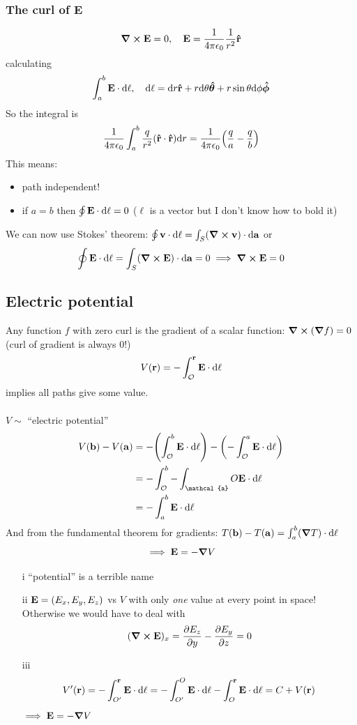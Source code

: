 \documentclass[../main.tex]{subfiles}
\begin{document}
\subsubsection{The curl of E}
\[\curl \vb E = 0, \quad \vb E = \frac{1}{4\pi \epsilon_0} \frac{1}{r^2} \vu r \]
calculating
\[\int_a^b \vb E \cdot \dd \ell, \quad \dd \ell = \dd r \vu r + r \dd \theta \vu*\theta + r\sin\theta \dd\phi \vu*\phi\]
So the integral is
\begin{align*}
    \ke \int_a^b \frac{q}{r^2}(\vu r \cdot \vu r) \dd r = \ke \qt(\frac{q}{a} - \frac{q}{b})
\end{align*}
This means:
\begin{itemize}
    \item path independent!
    \item if $a = b$ then $\oint \vb E \cdot \dd \vb\ell = 0$ ($\ell$ is a vector but I don't know how to bold it)
\end{itemize}
We can now use Stokes' theorem: \(\oint \vb v \cdot \dd \ell = \int_S (\curl \vb v) \cdot \dd \vb a\) or
\begin{align*}
    \oint \vb E \cdot \dd\ell = \int_S (\curl \vb E) \cdot \dd \vb a = 0 \implies \curl \vb E = 0
\end{align*}

\subsection{Electric potential}

Any function $f$ with zero curl is the gradient of a scalar function: \(\curl (\grad f) = 0\) (curl of gradient is always 0!)
\[V(\vb r) = - \int_\mathcal{O}^{\vb r} \vb E \cdot \dd \ell\]
implies all paths give some value.

\paragraph*{} $V \sim$ ``electric potential''
\begin{align*}
    V(\vb b) - V(\vb a) &= - \qt(\int_\mathcal{O}^b \vb E \cdot \dd \ell) - \qt(-\int_\mathcal{O}^a \vb E \cdot \dd\ell) \\
    &= - \int_\mathcal{O}^b - \int_\mathcal{a}{O} \vb E \cdot \dd\ell \\
    &= - \int_a^b \vb E \cdot \dd \ell
\end{align*}
And from the fundamental theorem for gradients: \(T(\vb b) - T(\vb a) = \int_a^b (\grad T) \cdot \dd\ell \)
\[\implies \vb E = -\grad V \]
\begin{enumerate}
    \item [i] ``potential'' is a terrible name
    \item [ii] $\vb E = (E_x, E_y, E_z)$ vs $V$ with only \emph{one} value at every point in space! Otherwise we would have to deal with
    \[(\curl \vb E)_x = \pdv{E_z}{y} - \pdv{E_y}{z} = 0\]
    \item [iii] \[V'(\vb r) = -\int_{O'}^{\vb r} \vb E \cdot \dd\ell = - \int_{O'}^O \vb E \cdot \dd\ell - \int_O^{\vb r} \vb E \cdot \dd\ell = C + V(\vb r) \]
    $\implies \vb E = - \grad V$
\end{enumerate}
\end{document}

